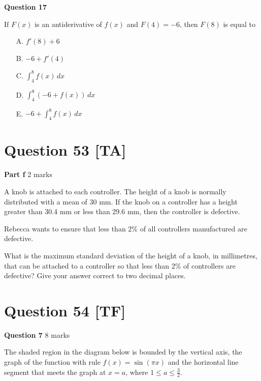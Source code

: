 \documentclass[10pt,a4paper]{article}
\begin{document}
\textbf{Question 17}

If $F(x)$ is an antiderivative of $f(x)$ and $F(4) = -6$, then $F(8)$ is equal to

\begin{enumerate}
    \item[A.] $f'(8) + 6$
    \item[B.] $-6 + f'(4)$
    \item[C.] $\int_4^8 f(x)\,dx$
    \item[D.] $\int_4^8 (-6 + f(x))\,dx$
    \item[E.] $-6 + \int_4^8 f(x)\,dx$
\end{enumerate}

\vspace{9\baselineskip}

\hrulefill

\section*{Question 53 [TA]}

\textbf{Part f} \hfill 2 marks

A knob is attached to each controller. The height of a knob is normally distributed with a mean of 30 mm. If the knob on a controller has a height greater than 30.4 mm or less than 29.6 mm, then the controller is defective.

Rebecca wants to ensure that less than 2\% of all controllers manufactured are defective.

What is the maximum standard deviation of the height of a knob, in millimetres, that can be attached to a controller so that less than 2\% of controllers are defective? Give your answer correct to two decimal places.

\vspace{9\baselineskip}

\hrulefill

\section*{Question 54 [TF]}

\textbf{Question 7} \hfill 8 marks

The shaded region in the diagram below is bounded by the vertical axis, the graph of the function with rule $f(x) = \sin(\pi x)$ and the horizontal line segment that meets the graph at $x = a$, where $1 \leq a \leq \frac{3}{2}$.
\end{document}
